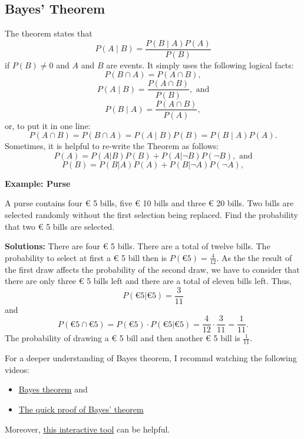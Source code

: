 \documentclass[
  12pt,
  oneside]{book}
\providecommand{\tightlist}{%
  \setlength{\itemsep}{0pt}\setlength{\parskip}{0pt}}
\theoremstyle{definition}
\theoremstyle{definition}
\theoremstyle{definition}
\theoremstyle{definition}
\theoremstyle{remark}
\begin{document}
\subsection{Bayes' Theorem}\label{bayes-theorem}

The theorem states that
\[P(A\mid B)={\frac {P(B\mid A)P(A)}{P(B)}} \]
if \(P(B)\neq 0\) and \(A\) and \(B\) are events. It simply uses the following logical facts:
\[P(B\cap A)=P(A\cap B),\]
\[P(A\mid B)=\frac {P(A\cap B)}{P(B)},  \text{ and}\]
\[P(B\mid A)=\frac {P(A\cap B)}{P(A)},\]
or, to put it in one line:
\[  P(A\cap B)= P(B\cap A)=P(A\mid B)P(B)=P(B\mid A)P(A).   \]
Sometimes, it is helpful to re-write the Theorem as follows:
\[P(A)=P(A|B)P(B)+P(A|\neg B)P(\neg B),  \text{ and}\]
\[P(B)=P(B|A)P(A)+P(B|\neg A)P(\neg A),\]

\textbf{Example: Purse}

A purse contains four € 5 bills, five € 10 bills and three € 20 bills. Two bills are selected randomly without the first selection being replaced. Find the probability that two € 5 bills are selected.

\textbf{Solutions:} There are four € 5 bills. There are a total of twelve bills.
The probability to select at first a € 5 bill then is \(P(\text{€} 5) = \frac{4}{12}\).
As the the result of the first draw affects the probability of the second draw, we have to consider that there are only three € 5 bills left and there are a total of eleven bills left. Thus,
\[
P(\text{€} 5 | \text{€} 5)=\frac{3}{11}
\]
and
\[
P(\text{€} 5 \cap \text{€} 5) = P(\text{€} 5) \cdot P(\text{€} 5 | \text{€} 5) = \frac{4}{12} \cdot \frac{3}{11}=\frac{1}{11}.
\]
The probability of drawing a € 5 bill and then another € 5 bill is \(\frac{1}{11}\).

For a deeper understanding of Bayes theorem, I recommd watching the following videos:

\begin{itemize}
\tightlist
\item
  \href{https://youtu.be/HZGCoVF3YvM}{Bayes theorem} and
\item
  \href{https://youtu.be/U_85TaXbeIo}{The quick proof of Bayes' theorem}
\end{itemize}

Moreover, \href{https://www.skobelevs.ie/BayesTheorem/}{this interactive tool} can be helpful.
\end{document}
